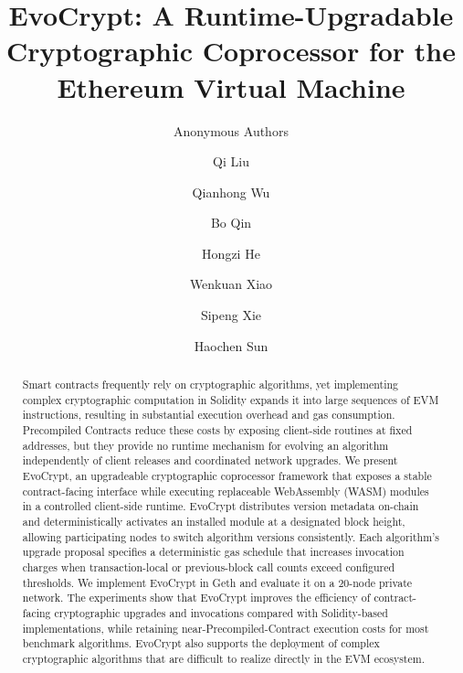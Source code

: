 \documentclass[runningheads]{llncs}
\begin{document}
\title{EvoCrypt: A Runtime-Upgradable Cryptographic Coprocessor for the Ethereum Virtual Machine}

\author{Anonymous Authors}
\author{Qi Liu \and
Qianhong Wu \and
Bo Qin\and
Hongzi He \and
Wenkuan Xiao \and
Sipeng Xie  \and
Haochen Sun
}



\maketitle

\begin{abstract}
Smart contracts frequently rely on cryptographic algorithms, yet implementing complex cryptographic computation in Solidity expands it into large sequences of EVM instructions, resulting in substantial execution overhead and gas consumption. Precompiled Contracts reduce these costs by exposing client-side routines at fixed addresses, but they provide no runtime mechanism for evolving an algorithm independently of client releases and coordinated network upgrades. We present EvoCrypt, an upgradeable cryptographic coprocessor framework  that exposes a stable contract-facing interface while executing replaceable WebAssembly (WASM) modules in a controlled client-side runtime. EvoCrypt distributes version metadata on-chain and deterministically activates an installed module at a designated block height, allowing participating nodes to switch algorithm versions consistently. Each algorithm's upgrade proposal specifies a deterministic gas schedule that increases invocation charges when transaction-local or previous-block call counts exceed configured thresholds. We implement EvoCrypt in Geth and evaluate it on a 20-node private network. The experiments show that EvoCrypt improves the efficiency of contract-facing cryptographic upgrades and invocations compared with Solidity-based implementations, while retaining near-Precompiled-Contract execution costs for most benchmark algorithms. EvoCrypt also supports the deployment of complex cryptographic algorithms that are difficult to realize directly in the EVM ecosystem.

\end{abstract}
\end{document}
